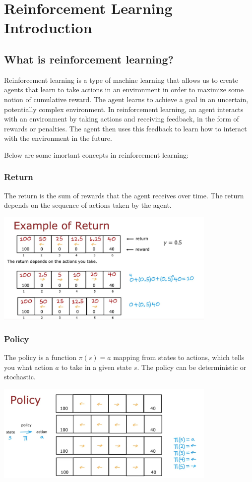 \chapter{Reinforcement Learning Introduction}
\section{What is reinforcement learning?}
Reinforcement learning is a type of machine learning that allows us
to create agents that learn to take actions in an environment in order to
maximize some notion of cumulative reward. The agent learns to achieve a goal in an uncertain, 
potentially complex environment. In reinforcement learning, an agent interacts with an environment 
by taking actions and receiving feedback, in the form of rewards or penalties. 
The agent then uses this feedback to learn how to interact with the environment in the future.

Below are some imortant concepts in reinforcement learning:
    \subsection*{Return}
    The return is the sum of rewards that the agent receives over time. 
    The return depends on the sequence of actions taken by the agent.\\
    \begin{center}
    \includegraphics*[width=0.8\textwidth]{images/17.1}
    \end{center}
    \subsection*{Policy}
    The policy is a function $\pi(s) = a$ mapping from states to actions, which tells you what action $a$ to take in 
    a given state $s$. The policy can be deterministic or stochastic.\\
    \begin{center}
    \includegraphics*[width=0.8\textwidth]{images/17.2}
    \end{center}
